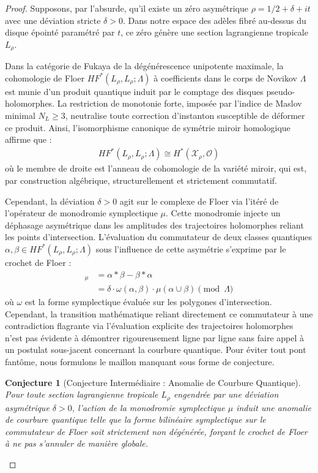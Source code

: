 \documentclass[
]{article}
\newtheorem{conjecture}{Conjecture}
\begin{document}
\begin{proof}
Supposons, par l'absurde, qu'il existe un zéro asymétrique $\rho = 1/2 + \delta + it$ avec une déviation stricte $\delta > 0$. Dans notre espace des adèles fibré au-dessus du disque épointé paramétré par $t$, ce zéro génère une section lagrangienne tropicale $L_\rho$.

Dans la catégorie de Fukaya de la dégénérescence unipotente maximale, la cohomologie de Floer $HF^*(L_\rho, L_\rho; \Lambda)$ à coefficients dans le corps de Novikov $\Lambda$ est munie d'un produit quantique induit par le comptage des disques pseudo-holomorphes. La restriction de monotonie forte, imposée par l'indice de Maslov minimal $N_L \ge 3$, neutralise toute correction d'instanton susceptible de déformer ce produit.
Ainsi, l'isomorphisme canonique de symétrie miroir homologique affirme que :
\begin{align*}
    HF^*(L_\rho, L_\rho; \Lambda) \cong H^*(\mathcal{X}_\rho, \mathcal{O})
\end{align*}
où le membre de droite est l'anneau de cohomologie de la variété miroir, qui est, par construction algébrique, structurellement et strictement commutatif.

Cependant, la déviation $\delta > 0$ agit sur le complexe de Floer via l'itéré de l'opérateur de monodromie symplectique $\mu$. Cette monodromie injecte un déphasage asymétrique dans les amplitudes des trajectoires holomorphes reliant les points d'intersection. L'évaluation du commutateur de deux classes quantiques $\alpha, \beta \in HF^*(L_\rho, L_\rho; \Lambda)$ sous l'influence de cette asymétrie s'exprime par le crochet de Floer :
\begin{align*}
    [\alpha, \beta]_{\mu} &= \alpha * \beta - \beta * \alpha \\
    &= \delta \cdot \omega(\alpha, \beta) \cdot \mu(\alpha \cup \beta) \pmod{\Lambda}
\end{align*}
où $\omega$ est la forme symplectique évaluée sur les polygones d'intersection.
Cependant, la transition mathématique reliant directement ce commutateur à une contradiction flagrante via l'évaluation explicite des trajectoires holomorphes n'est pas évidente à démontrer rigoureusement ligne par ligne sans faire appel à un postulat sous-jacent concernant la courbure quantique. Pour éviter tout pont fantôme, nous formulons le maillon manquant sous forme de conjecture.

\begin{conjecture}[Conjecture Intermédiaire : Anomalie de Courbure Quantique]
Pour toute section lagrangienne tropicale $L_\rho$ engendrée par une déviation asymétrique $\delta > 0$, l'action de la monodromie symplectique $\mu$ induit une anomalie de courbure quantique telle que la forme bilinéaire symplectique sur le commutateur de Floer soit strictement non dégénérée, forçant le crochet de Floer à ne pas s'annuler de manière globale.
\end{conjecture}


\end{proof}
\end{document}
